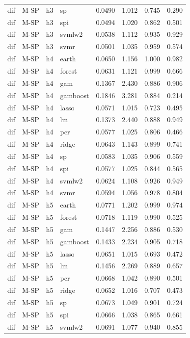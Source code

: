 \begin{ThreePartTable}
\begin{longtable}[t]{llclcccc}
dif & M-SP & h3 & sp & 0.0490 & 1.012 & 0.745 & 0.290\\
dif & M-SP & h3 & spi & 0.0494 & 1.020 & 0.862 & 0.501\\
dif & M-SP & h3 & svmlw2 & 0.0538 & 1.112 & 0.935 & 0.929\\
dif & M-SP & h3 & svmr & 0.0501 & 1.035 & 0.959 & 0.574\\
\addlinespace
dif & M-SP & h4 & earth & 0.0650 & 1.156 & 1.000 & 0.982\\
dif & M-SP & h4 & forest & 0.0631 & 1.121 & 0.999 & 0.666\\
dif & M-SP & h4 & gam & 0.1367 & 2.430 & 0.886 & 0.906\\
dif & M-SP & h4 & gamboost & 0.1846 & 3.281 & 0.884 & 0.214\\
dif & M-SP & h4 & lasso & 0.0571 & 1.015 & 0.723 & 0.495\\
dif & M-SP & h4 & lm & 0.1373 & 2.440 & 0.888 & 0.949\\
dif & M-SP & h4 & pcr & 0.0577 & 1.025 & 0.806 & 0.466\\
dif & M-SP & h4 & ridge & 0.0643 & 1.143 & 0.899 & 0.741\\
dif & M-SP & h4 & sp & 0.0583 & 1.035 & 0.906 & 0.559\\
dif & M-SP & h4 & spi & 0.0577 & 1.025 & 0.844 & 0.565\\
dif & M-SP & h4 & svmlw2 & 0.0624 & 1.108 & 0.926 & 0.949\\
dif & M-SP & h4 & svmr & 0.0594 & 1.056 & 0.978 & 0.804\\
\addlinespace
dif & M-SP & h5 & earth & 0.0771 & 1.202 & 0.999 & 0.974\\
dif & M-SP & h5 & forest & 0.0718 & 1.119 & 0.990 & 0.525\\
dif & M-SP & h5 & gam & 0.1447 & 2.256 & 0.886 & 0.530\\
dif & M-SP & h5 & gamboost & 0.1433 & 2.234 & 0.905 & 0.718\\
dif & M-SP & h5 & lasso & 0.0651 & 1.015 & 0.693 & 0.472\\
dif & M-SP & h5 & lm & 0.1456 & 2.269 & 0.889 & 0.657\\
dif & M-SP & h5 & pcr & 0.0668 & 1.042 & 0.890 & 0.501\\
dif & M-SP & h5 & ridge & 0.0652 & 1.016 & 0.707 & 0.473\\
dif & M-SP & h5 & sp & 0.0673 & 1.049 & 0.901 & 0.724\\
dif & M-SP & h5 & spi & 0.0666 & 1.038 & 0.865 & 0.661\\
dif & M-SP & h5 & svmlw2 & 0.0691 & 1.077 & 0.940 & 0.855\\

\end{longtable}
\end{ThreePartTable}
